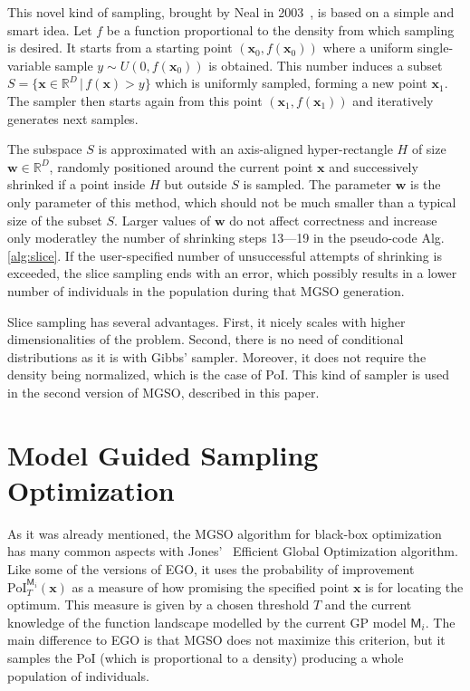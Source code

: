 \documentclass{itatnew}
\newcommand{\xx}{\mathrm{\mathbf{x}}}
\begin{document}
This novel kind of sampling, brought by Neal in 2003~\cite{neal_slice_2003}, is based on a simple and smart idea. Let $f$ be a function proportional to the density from which sampling is desired. It starts from a starting point $(\xx_0, f(\xx_0))$ where a uniform single-variable sample $y \sim U(0,f(\xx_0))$ is obtained. This number induces a subset $S=\{\xx \in \mathbb{R}^D \,|\, f(\xx) > y\}$ which is
uniformly sampled, forming a new point $\xx_1$. The sampler then starts again from this point $(\xx_1, f(\xx_1))$ and iteratively generates next samples.

The subspace $S$ is approximated with an axis-aligned hyper-rectangle $H$ of size $\mathbf{w} \in \mathbb{R}^D$, randomly positioned around the current point $\xx$ and successively shrinked if a point inside $H$ but outside $S$ is sampled. The parameter $\mathbf{w}$ is the only parameter of this method, which should not be much smaller than a typical size of the subset $S$. Larger values of $\mathbf{w}$ do not affect correctness and increase only moderatley the number of shrinking steps 13---19 in the pseudo-code Alg.\,\ref{alg:slice}. If the user-specified number of unsuccessful attempts of shrinking is exceeded, the slice sampling ends with an error, which possibly results in a lower number of individuals in the population during that MGSO generation.

Slice sampling has several advantages. First, it nicely scales with higher dimensionalities of the problem. Second, there is no need of conditional distributions as it is with Gibbs' sampler. Moreover, it does not require the density being normalized, which is the case of PoI. This kind of sampler is used in the second version of MGSO, described in this paper.


\section{Model Guided Sampling Optimization}
\label{sec:mgso}

As it was already mentioned, the MGSO algorithm for black-box optimization has many common aspects with Jones'~\cite{jones_efficient_1998} Efficient Global Optimization algorithm. Like some of the versions of EGO, it uses the probability of improvement $\mathrm{PoI}_T^{\mathsf{M}_i}(\xx)$ as a measure of how promising the specified point $\xx$ is for locating the optimum. This measure is given by a chosen threshold $T$ and the current knowledge of the function landscape
modelled by the current GP model $\mathsf{M}_i$. The main difference to EGO is that MGSO does not maximize this criterion, but it samples the PoI (which is proportional to a density) producing a whole population of individuals. 
\end{document}
